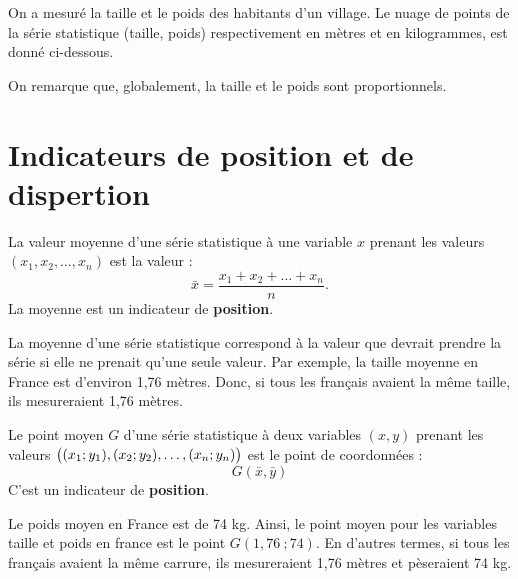 \documentclass[a4paper, 12pt]{report}
\begin{document}
\begin{ex}
On a mesuré la taille et le poids des habitants d'un village. Le nuage de points de la série statistique (taille, poids) respectivement en mètres et en kilogrammes, est donné ci-dessous.
\begin{center}
\end{center}
On remarque que, globalement, la taille et le poids sont proportionnels.
\end{ex}

\section{Indicateurs de position et de dispertion}

\begin{defn}[Moyenne]
La valeur moyenne d'une série statistique à une variable $x$ prenant les valeurs $(x_1, x_2, \dots, x_n)$ est la valeur :
\[ \bar{x} = \dfrac{x_1 + x_2 + \dots + x_n}{n} . \]
La moyenne est un indicateur de \textbf{position}.
\end{defn}

\begin{rmq}
La moyenne d'une série statistique correspond à la valeur que devrait prendre la série si elle ne prenait qu'une seule valeur.
Par exemple, la taille moyenne en France est d'environ 1,76 mètres. Donc, si tous les français avaient la même taille,
ils mesureraient 1,76 mètres.
\end{rmq}

\begin{defn}
Le point moyen $G$ d'une série statistique à deux variables $(x,y)$ prenant les valeurs $\bigl( (x_1; y_1), (x_2; y_2), \dots, (x_n;y_n) \bigr)$ 
est le point de coordonnées :
\[ G( \bar{x}, \bar{y}) \]
C'est un indicateur de \textbf{position}.
\end{defn}

\begin{rmq}
Le poids moyen en France est de 74 kg. Ainsi, le point moyen pour les variables taille et poids en france est le point $G(1,76~; 74)$.
En d'autres termes, si tous les français avaient la même carrure, ils mesureraient 1,76 mètres et pèseraient 74 kg.
\end{rmq}
\end{document}
